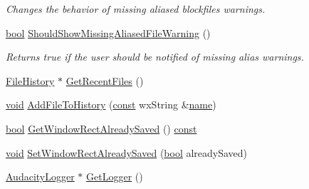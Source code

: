 \begin{DoxyCompactItemize}
\begin{DoxyCompactList}\small\item\em Changes the behavior of missing aliased blockfiles warnings. \end{DoxyCompactList}\item 
\hyperlink{mac_2config_2i386_2lib-src_2libsoxr_2soxr-config_8h_abb452686968e48b67397da5f97445f5b}{bool} \hyperlink{class_audacity_app_abc0f3a085ee4f6319dd6bfd835a9f2c7}{Should\+Show\+Missing\+Aliased\+File\+Warning} ()
\begin{DoxyCompactList}\small\item\em Returns true if the user should be notified of missing alias warnings. \end{DoxyCompactList}\item 
\hyperlink{class_file_history}{File\+History} $\ast$ \hyperlink{class_audacity_app_ab6855b1bf393074014259f42d06722ba}{Get\+Recent\+Files} ()
\item 
\hyperlink{sound_8c_ae35f5844602719cf66324f4de2a658b3}{void} \hyperlink{class_audacity_app_aa9461c56195b9a1b8eb931293d0b491f}{Add\+File\+To\+History} (\hyperlink{getopt1_8c_a2c212835823e3c54a8ab6d95c652660e}{const} wx\+String \&\hyperlink{lib_2expat_8h_a1b49b495b59f9e73205b69ad1a2965b0}{name})
\item 
\hyperlink{mac_2config_2i386_2lib-src_2libsoxr_2soxr-config_8h_abb452686968e48b67397da5f97445f5b}{bool} \hyperlink{class_audacity_app_a00bedc0311ae18ae788289f24310e184}{Get\+Window\+Rect\+Already\+Saved} () \hyperlink{getopt1_8c_a2c212835823e3c54a8ab6d95c652660e}{const} 
\item 
\hyperlink{sound_8c_ae35f5844602719cf66324f4de2a658b3}{void} \hyperlink{class_audacity_app_ac063acdbedfc07101331440a4973ca14}{Set\+Window\+Rect\+Already\+Saved} (\hyperlink{mac_2config_2i386_2lib-src_2libsoxr_2soxr-config_8h_abb452686968e48b67397da5f97445f5b}{bool} already\+Saved)
\item 
\hyperlink{class_audacity_logger}{Audacity\+Logger} $\ast$ \hyperlink{class_audacity_app_ad4333c2bc7745b74a84ac5722b5bb456}{Get\+Logger} ()
\end{DoxyCompactItemize}
